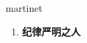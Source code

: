 
\begin{frame}
{\huge martinet}
\begin{center}
\begin{enumerate}\Large
  \item \textbf{纪律严明之人}
\end{enumerate}
\end{center}
\end{frame}
